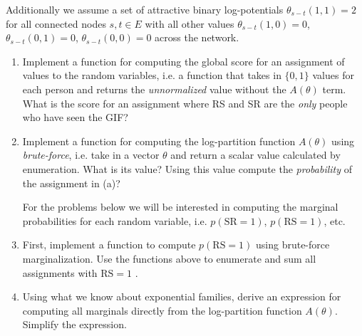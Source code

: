 \documentclass[submit]{harvardml}
\theoremstyle{plain}
\begin{document}
Additionally we assume a set of attractive binary log-potentials $\theta_{s - t}(1, 1) = 2$ for all connected nodes $s, t \in E$  with all other values $\theta_{s - t}(1, 0) = 0$, $\theta_{s - t}(0, 1) = 0$, $\theta_{s - t}(0, 0) = 0$  across the network.

\noindent


\begin{problem}[30pts]
  \begin{enumerate}[label=(\alph*)]

(Note: for this problem you will be deriving several properties of
    undirected graphical models and implementing these properties in
    Python/PyTorch. Before getting started it is worth getting
    familiar with the \texttt{itertools} package in Python and also
    being sure you understand how PyTorch variables work. In
    particular try writing a simple scalar function with several
    vector-valued Variables as inputs and making you understand
    what the function \texttt{.backward} does in practice.)


~


\item Implement a function for computing the global score for an
  assignment of values to the random variables, i.e. a function that
  takes in $\{0, 1\}$ values for each person and returns the
  \textit{unnormalized} value without the $A(\theta)$ term.  What is
  the score for an assignment where RS and SR are the \textit{only}
  people who have seen the GIF?

\item Implement a function for computing the log-partition function
  $A(\theta)$ using \textit{brute-force}, i.e. take in a vector
  $\theta$ and return a scalar value calculated by enumeration. What
  is its value?  Using this value compute the \textit{probability} of
  the assignment in (a)?



\vspace*{0.5cm}

 For the problems below we will be interested in computing the
  marginal probabilities for each random variable, i.e. $p(\text{SR}=1)$,
  $p(\text{RS}=1)$, etc.

\item  First, implement a function to compute $p(\text{RS}=1)$ using
  brute-force marginalization. Use the functions above to enumerate and sum all assignments with $\text{RS}=1$ .

\item Using what we know about exponential families, derive an
  expression for computing all marginals directly from the
  log-partition function $A(\theta)$. Simplify the expression.


\end{enumerate}
\end{problem}
\end{document}
